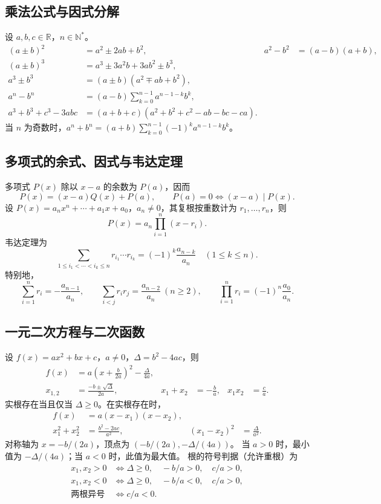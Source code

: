 \documentclass[../main.tex]{subfiles}
\begin{document}
\subsection{乘法公式与因式分解}
设 $a,b,c\in\mathbb R$，$n\in\mathbb N^*$。
\begin{align*}
(a\pm b)^2&=a^2\pm2ab+b^2, & a^2-b^2&=(a-b)(a+b),\\
(a\pm b)^3&=a^3\pm3a^2b+3ab^2\pm b^3,\\
a^3\pm b^3&=(a\pm b)(a^2\mp ab+b^2),\\
a^n-b^n&=(a-b)\sum_{k=0}^{n-1}a^{n-1-k}b^k,\\
a^3+b^3+c^3-3abc&=(a+b+c)(a^2+b^2+c^2-ab-bc-ca).
\end{align*}
当 $n$ 为奇数时，$a^n+b^n=(a+b)\sum_{k=0}^{n-1}(-1)^ka^{n-1-k}b^k$。
\subsection{多项式的余式、因式与韦达定理}
多项式 $P(x)$ 除以 $x-a$ 的余数为 $P(a)$，因而
\[
P(x)=(x-a)Q(x)+P(a),\qquad P(a)=0\iff(x-a)\mid P(x).
\]
设 $P(x)=a_nx^n+\cdots+a_1x+a_0$，$a_n\ne0$，其复根按重数计为 $r_1,\ldots,r_n$，则
\[
P(x)=a_n\prod_{i=1}^n(x-r_i).
\]
韦达定理为
\[
\sum_{1\le i_1<\cdots<i_k\le n}r_{i_1}\cdots r_{i_k}
=(-1)^k\frac{a_{n-k}}{a_n}\quad(1\le k\le n).
\]
特别地，
\[
\sum_{i=1}^nr_i=-\frac{a_{n-1}}{a_n},\qquad
\sum_{i<j}r_ir_j=\frac{a_{n-2}}{a_n}\ (n\ge2),\qquad
\prod_{i=1}^nr_i=(-1)^n\frac{a_0}{a_n}.
\]
\subsection{一元二次方程与二次函数}
设 $f(x)=ax^2+bx+c$，$a\ne0$，$\Delta=b^2-4ac$，则
\begin{align*}
f(x)&=a\left(x+\frac b{2a}\right)^2-\frac{\Delta}{4a},\\
x_{1,2}&=\frac{-b\pm\sqrt\Delta}{2a}, &
x_1+x_2&=-\frac ba, & x_1x_2&=\frac ca.
\end{align*}
实根存在当且仅当 $\Delta\ge0$。在实根存在时，
\begin{align*}
f(x)&=a(x-x_1)(x-x_2),\\
x_1^2+x_2^2&=\frac{b^2-2ac}{a^2}, &
(x_1-x_2)^2&=\frac\Delta{a^2}.
\end{align*}
对称轴为 $x=-b/(2a)$，顶点为 $(-b/(2a),-\Delta/(4a))$。
当 $a>0$ 时，最小值为 $-\Delta/(4a)$；当 $a<0$ 时，此值为最大值。
根的符号判据（允许重根）为
\begin{align*}
x_1,x_2>0&\iff\Delta\ge0,\quad -b/a>0,\quad c/a>0,\\
x_1,x_2<0&\iff\Delta\ge0,\quad -b/a<0,\quad c/a>0,\\
\text{两根异号}&\iff c/a<0.
\end{align*}
\end{document}
